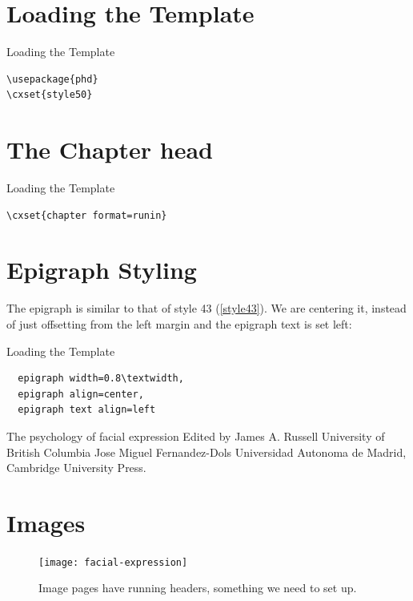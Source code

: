 \section{Loading the Template}

\begin{scriptexample}{Loading the Template}
\begin{verbatim}
\usepackage{phd}
\cxset{style50}
\end{verbatim}
\end{scriptexample}

\section{The Chapter head}
\begin{scriptexample}{Loading the Template}{}
\begin{verbatim}
\cxset{chapter format=runin}
\end{verbatim}
\end{scriptexample}

\section{Epigraph Styling}
The epigraph is similar to that of style 43 (\autoref{style43}). We are centering it, instead of just offsetting from the left margin and the epigraph text is set left:

\begin{scriptexample}{Loading the Template}
\begin{verbatim}
  epigraph width=0.8\textwidth,
  epigraph align=center,
  epigraph text align=left
\end{verbatim}
\end{scriptexample}




The psychology of facial
expression
Edited by
James A. Russell
University of British Columbia
Jose Miguel Fernandez-Dols
Universidad Autonoma de Madrid, Cambridge University Press.

\section{Images}

\begin{figure}[htbp]
\texttt{[image: facial-expression]}
\caption{Image pages have running headers, something we need to set up.}
\end{figure}

%

\makeatletter\@runinheadfalse\makeatother